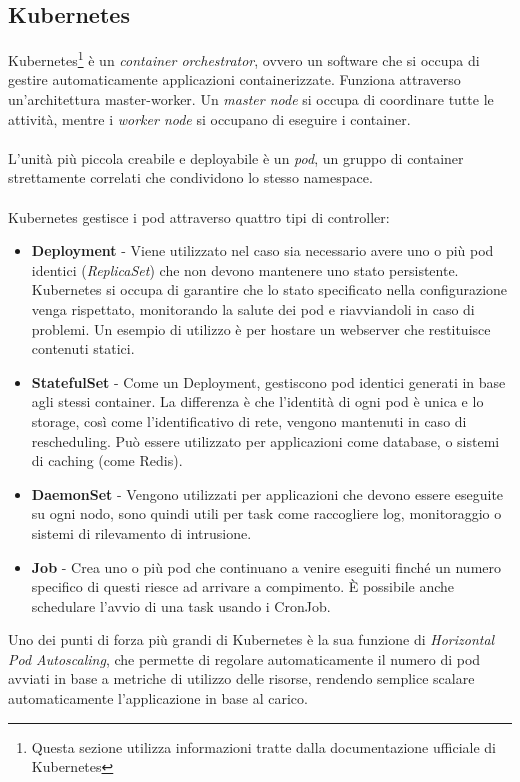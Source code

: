 \subsection{Kubernetes}
Kubernetes\footnote{Questa sezione utilizza informazioni tratte dalla documentazione ufficiale di Kubernetes\cite{kubernetesdocs}}
\`e un \textit{container orchestrator}, ovvero un software che si occupa di gestire automaticamente applicazioni containerizzate.
Funziona attraverso un'architettura master-worker. Un \textit{master node} si occupa di coordinare tutte le attivit\`a, mentre i \textit{worker node} si occupano di eseguire i container.
\\\\
L'unit\`a pi\`u piccola creabile e deployabile \`e un \textit{pod}, un gruppo di container strettamente correlati che condividono lo stesso namespace.
\\\\
Kubernetes gestisce i pod attraverso quattro tipi di controller:
\begin{itemize}
  \item \textbf{Deployment} - Viene utilizzato nel caso sia necessario avere uno o pi\`u pod identici (\textit{ReplicaSet}) che non devono mantenere uno stato persistente. Kubernetes si occupa
    di garantire che lo stato specificato nella configurazione venga rispettato, monitorando la salute dei pod e riavviandoli in caso di problemi.
    Un esempio di utilizzo è per hostare un webserver che restituisce contenuti statici.
  \item \textbf{StatefulSet} - Come un Deployment, gestiscono pod identici generati in base agli stessi container. La differenza è che l'identità di ogni pod è unica e lo storage, così come l'identificativo di rete,
    vengono mantenuti in caso di rescheduling. Può essere utilizzato per applicazioni come database, o sistemi di caching (come Redis).
  \item \textbf{DaemonSet} - Vengono utilizzati per applicazioni che devono essere eseguite su ogni nodo, sono quindi utili per task come raccogliere log, monitoraggio o sistemi di rilevamento di intrusione.
  \item \textbf{Job} - Crea uno o pi\`u pod che continuano a venire eseguiti finch\'e un numero specifico di questi riesce ad arrivare a compimento. \`E possibile anche schedulare l'avvio di
    una task usando i CronJob.
\end{itemize}
Uno dei punti di forza pi\`u grandi di Kubernetes \`e la sua funzione di \textit{Horizontal Pod Autoscaling}, che permette di regolare automaticamente il numero di pod avviati in base a
metriche di utilizzo delle risorse, rendendo semplice scalare automaticamente l'applicazione in base al carico.
